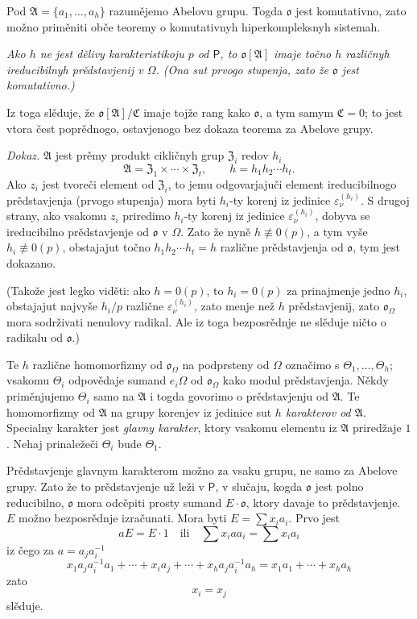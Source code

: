 \documentclass[11pt]{article}
\begin{document}
Pod \(\mathfrak A=\{a_1,\ldots,a_h\}\) razumějemo Abelovu grupu. Togda \(\mathfrak o\) jest komutativno, zato možno priměniti obče teoremy o komutativnyh hiperkompleksnyh sistemah.

\emph{Ako \(h\) ne jest dělivy karakteristikoju \(p\) od \(\mathsf P\), to \(\mathfrak o[\mathfrak A]\) imaje točno \(h\) različnyh ireducibilnyh prědstavjenij v \(\Omega\). (Ona sut prvogo stupenja, zato že \(\mathfrak o\) jest komutativno.)}

Iz toga slěduje, že \(\mathfrak o[\mathfrak A]/\mathfrak C\) imaje tojže rang kako \(\mathfrak o\), a tym samym \(\mathfrak C=0\); to jest vtora čest poprědnogo, ostavjenogo bez dokaza teorema za Abelove grupy.

\emph{Dokaz.} \(\mathfrak A\) jest prěmy produkt cikličnyh grup \(\mathfrak Z_i\) redov \(h_i\)
\[
\mathfrak A=\mathfrak Z_1\times\cdots\times\mathfrak Z_t,\qquad
h=h_1h_2\cdots h_t .
\]
Ako \(z_i\) jest tvoreči element od \(\mathfrak Z_i\), to jemu odgovarjajuči element ireducibilnogo prědstavjenja (prvogo stupenja) mora byti \(h_i\)-ty korenj iz jedinice \(\varepsilon_\nu^{(h_i)}\). S drugoj strany, ako vsakomu \(z_i\) priredimo \(h_i\)-ty korenj iz jedinice \(\varepsilon_\nu^{(h_i)}\), dobyva se ireducibilno prědstavjenje od \(\mathfrak o\) v \(\Omega\). Zato že nyně \(h\not\equiv0(p)\), a tym vyše \(h_i\not\equiv0(p)\), obstajajut točno \(h_1h_2\cdots h_t=h\) različne prědstavjenja od \(\mathfrak o\), tym jest dokazano.

(Takože jest legko viděti: ako \(h=0(p)\), to \(h_i=0(p)\) za prinajmenje jedno \(h_i\), obstajajut najvyše \(h_i/p\) različne \(\varepsilon_\nu^{(h_i)}\), zato menje než \(h\) prědstavjenij, zato \(\mathfrak o_\Omega\) mora sodrživati nenulovy radikal. Ale iz toga bezposrědnje ne slěduje ničto o radikalu od \(\mathfrak o\).)

Te \(h\) različne homomorfizmy od \(\mathfrak o_\Omega\) na podprsteny od \(\Omega\) označimo s \(\Theta_1,\ldots,\Theta_h\); vsakomu \(\Theta_i\) odpovědaje sumand \(e_i\Omega\) od \(\mathfrak o_\Omega\) kako modul prědstavjenja. Někdy priměnjujemo \(\Theta_i\) samo na \(\mathfrak A\) i togda govorimo o prědstavjenju od \(\mathfrak A\). Te homomorfizmy od \(\mathfrak A\) na grupy korenjev iz jedinice sut \emph{\(h\) karakterov od \(\mathfrak A\)}. Specialny karakter jest \emph{glavny karakter}, ktory vsakomu elementu iz \(\mathfrak A\) priredžaje \(1\). Nehaj prinaležeči \(\Theta_i\) bude \(\Theta_1\).

Prědstavjenje glavnym karakterom možno za vsaku grupu, ne samo za Abelove grupy. Zato že to prědstavjenje už leži v \(\mathsf P\), v slučaju, kogda \(\mathfrak o\) jest polno reducibilno, \(\mathfrak o\) mora odcěpiti prosty sumand \(E\cdot\mathfrak o\), ktory davaje to prědstavjenje. \(E\) možno bezposrědnje izračunati. Mora byti \(E=\sum x_i a_i\). Prvo jest
\[
aE=E\cdot 1\quad\text{ili}\quad \sum x_i a a_i=\sum x_i a_i
\]
iz čego za \(a=a_j a_i^{-1}\)
\[
x_1a_ja_i^{-1}a_1+\cdots+x_i a_j+\cdots+x_ha_ja_i^{-1}a_h
=x_1a_1+\cdots+x_ha_h
\]
zato
\[
x_i=x_j
\]
slěduje.
\end{document}

